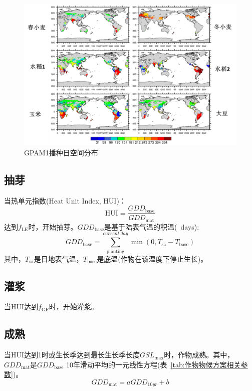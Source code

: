 {
\begin{figure}[htbp]
  \centering
  \includegraphics[scale=1.2]{Figures/作物模式/GPAM1播种日空间分布.png}
  \caption{GPAM1播种日空间分布}
  \label{fig:GPAM1播种日空间分布}
\end{figure}
}

\subsection{抽芽}
当热单元指数(Heat Unit Index, ${\mathrm {HUI}}$)：
\begin{equation}\label{HUI}
  {\mathrm {HUI}}=\frac{GDD_{\mathrm{base}}}{GDD_{\mathrm{mat}}}
\end{equation}
达到$f_{\mathrm{LE}}$时，开始抽芽。$GDD_{\mathrm{base}}$是基于陆表气温的积温(\textcelsius\ days):
\begin{equation}
  GDD_{\mathrm{ {base }}}=\sum_{\mathrm{planting}}^{current\ day} \min \left(0, T_{\mathrm{sa}}-T_{\mathrm{base}}\right)
\end{equation}
其中，$T_{\mathrm{sa}}$是日地表气温，$T_{\mathrm{base}}$是底温(作物在该温度下停止生长)。

\subsection{灌浆}
当${\mathrm {HUI}}$达到$f_{\mathrm{GF}}$时，开始灌浆。

\subsection{成熟}
当${\mathrm {HUI}}$达到1时或生长季达到最长生长季长度$GSL_{\mathrm{max}}$时，作物成熟。其中，$GDD_{\mathrm{mat}}$是$GDD_{\mathrm{base}}$
10年滑动平均的一元线性方程(表~\ref{tab:作物物候方案相关参数})。
\begin{equation}
  GDD_{\mathrm{mat}}=a GDD_{10yr}+b
\end{equation}

